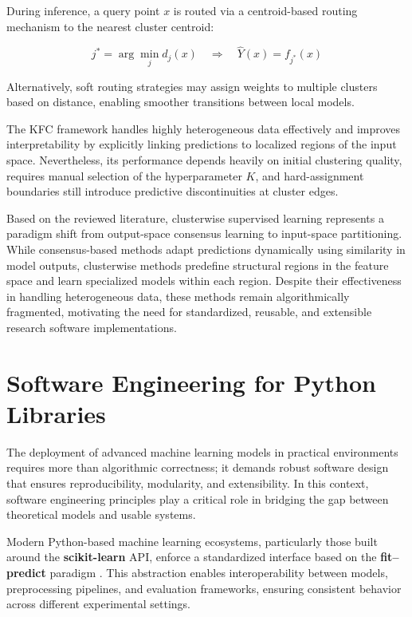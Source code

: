 During inference, a query point $x$ is routed via a centroid-based routing mechanism to the nearest cluster centroid:

\[    
    j^* = \arg\min_j d_j(x)
    \quad \Rightarrow \quad
    \hat{Y}(x) = f_{j^*}(x)
\]

Alternatively, soft routing strategies may assign weights to multiple clusters based on distance, enabling smoother transitions between local models.

The KFC framework handles highly heterogeneous data effectively and improves interpretability by explicitly linking predictions to localized regions of the input space. Nevertheless, its performance depends heavily on initial clustering quality, requires manual selection of the hyperparameter $K$, and hard-assignment boundaries still introduce predictive discontinuities at cluster edges.

Based on the reviewed literature, clusterwise supervised learning represents a paradigm shift from output-space consensus learning to input-space partitioning. While consensus-based methods adapt predictions dynamically using similarity in model outputs, clusterwise methods predefine structural regions in the feature space and learn specialized models within each region. Despite their effectiveness in handling heterogeneous data, these methods remain algorithmically fragmented, motivating the need for standardized, reusable, and extensible research software implementations.

\section{Software Engineering for Python Libraries}

\hs The deployment of advanced machine learning models in practical environments requires more than algorithmic correctness; it demands robust software design that ensures reproducibility, modularity, and extensibility. In this context, software engineering principles play a critical role in bridging the gap between theoretical models and usable systems.

Modern Python-based machine learning ecosystems, particularly those built around the \textbf{scikit-learn} API, enforce a standardized interface based on the \textbf{fit--predict} paradigm \cite{pedregosa2011sklearn,buitinck2013api}. This abstraction enables interoperability between models, preprocessing pipelines, and evaluation frameworks, ensuring consistent behavior across different experimental settings.

